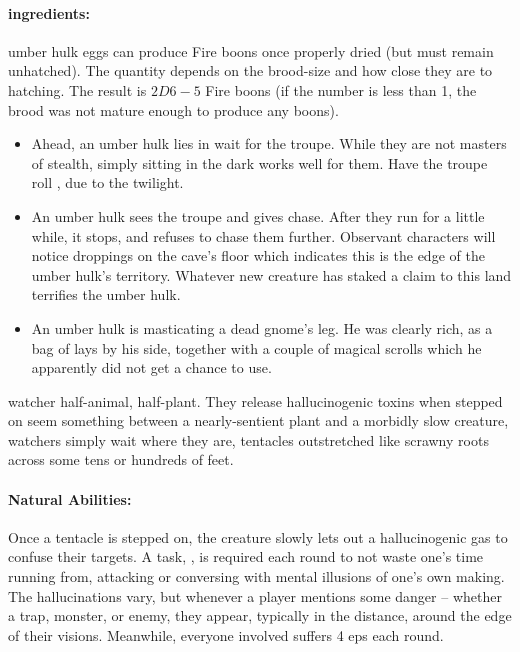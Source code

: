 \begin{multicols}{2}
\paragraph{\Glspl{ingredient}:}
umber hulk eggs can produce Fire \glspl{boon} once properly dried (but must remain unhatched).
The quantity depends on the brood-size and how close they are to hatching.
The result is $2D6-5$ Fire \glspl{boon} (if the number is less than 1, the brood was not mature enough to produce any \glspl{boon}).

\showEnc

\begin{itemize}
  \item
  Ahead, an umber hulk lies in wait for the troupe.
  While they are not masters of stealth, simply sitting in the dark works well for them.
  Have the troupe roll , \tn[9] due to the twilight.
  \item
  An umber hulk sees the troupe and gives chase.
  After they run for a little while, it stops, and refuses to chase them further.
  Observant characters will notice droppings on the cave's floor which indicates this is the edge of the umber hulk's territory.
  Whatever new creature has staked a claim to this land terrifies the umber hulk.
  \item
  An umber hulk is masticating a dead gnome's leg.
  He was clearly rich, as a bag of  lays by his side, together with a couple of magical scrolls which he apparently did not get a chance to use.
\end{itemize}

\umberhulk

  {watcher}%
  {half-animal, half-plant. They release hallucinogenic toxins when stepped on}%
seem something between a nearly-sentient plant and a morbidly slow creature, watchers simply wait where they are, tentacles outstretched like scrawny roots across some tens or hundreds of feet.

\paragraph{Natural Abilities:}
Once a tentacle is stepped on, the creature slowly lets out a hallucinogenic gas to confuse their targets.
A  task, \tn[10], is required each round to not waste one's time running from, attacking or conversing with mental illusions of one's own making.
The hallucinations vary, but whenever a player mentions some danger -- whether a trap, monster, or enemy, they appear, typically in the distance, around the edge of their visions.
Meanwhile, everyone involved suffers 4 \glspl{ep} each round.


\end{multicols}
